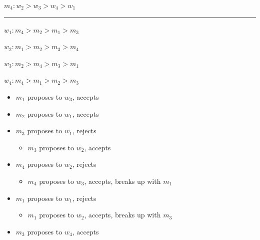\documentclass[11pt]{article}
\begin{document}
\(m_4: w_2 > w_3 > w_4 > w_1\)

\noindent\rule{\textwidth}{0.5pt}

\(w_1: m_4 > m_2 > m_1 > m_3\)

\(w_2: m_1 > m_2 > m_3 > m_4\)

\(w_3: m_2 > m_4 > m_3 > m_1\)

\(w_4: m_4 > m_1 > m_2 > m_3\)

\begin{itemize}
\item \(m_1\) proposes to \(w_3\), accepts
\item \(m_2\) proposes to \(w_1\), accepts
\item \(m_3\) proposes to \(w_1\), rejects
\begin{itemize}
\item \(m_3\) proposes to \(w_2\), accepts
\end{itemize}
\item \(m_4\) proposes to \(w_2\), rejects
\begin{itemize}
\item \(m_4\) proposes to \(w_3\), accepts, breaks up with \(m_1\)
\end{itemize}
\item \(m_1\) proposes to \(w_1\), rejects
\begin{itemize}
\item \(m_1\) proposes to \(w_2\), accepts, breaks up with \(m_3\)
\end{itemize}
\item \(m_3\) proposes to \(w_4\), accepts
\end{itemize}
\end{document}
